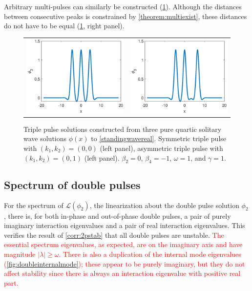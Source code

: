 \documentclass[12pt]{elsarticle}
\def\calL{{\mathcal L}}
\newcommand{\revised}[1]{ \textcolor{red}{#1} }
\begin{document}
Arbitrary multi-pulses can similarly be constructed (\cref{fig:triplepulses}). Although the distances between consecutive peaks is constrained by \cref{theorem:multiexist}, these distances do not have to be equal (\cref{fig:triplepulses}, right panel).

\begin{figure}[H]
\centering
\begin{tabular}{cc}
\includegraphics[width=8cm]{images/triple00} &
\includegraphics[width=8cm]{images/triple01}
\end{tabular}
\caption{Triple pulse solutions constructed from three pure quartic solitary wave solutions $\phi(x)$ to \cref{standingwavereal}. Symmetric triple pulse with $(k_1, k_2) = (0,0)$ (left panel), asymmetric triple pulse with $(k_1, k_2) = (0,1)$ (left panel). $\beta_2 = 0$, $\beta_4 = -1$, $\omega = 1$, and $\gamma = 1$. }
\label{fig:triplepulses}
\end{figure} 

\subsection{Spectrum of double pulses}

For the spectrum of $\calL(\phi_2)$, the linearization about the double pulse solution $\phi_2$, there is, for both in-phase and out-of-phase double pulses, a pair of purely imaginary interaction eigenvalues and a pair of real interaction eigenvalues. This verifies the result of \cref{corr:2pstab} that all double pulses are unstable. \revised{The essential spectrum eigenvalues, as expected, are on the imaginary axis and have magnitude $|\lambda| \geq \omega$. There is also a duplication of the internal mode eigenvalues (\cref{fig:doubleinternalmode}); these appear to be purely imaginary, but they do not affect stability since there is always an interaction eigenvalue with positive real part.}
\end{document}
